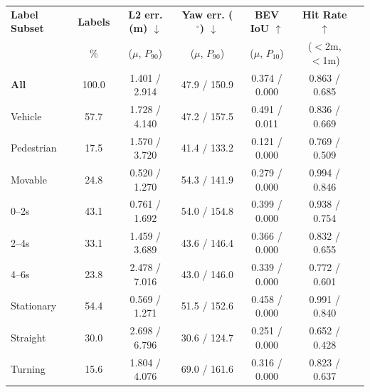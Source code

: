 \begin{tabular}{lcccccc}
\toprule
\textbf{Label Subset} & \textbf{Labels} & \textbf{L2 err. (m) $\downarrow$} & \textbf{Yaw err. ($^\circ$) $\downarrow$} & \textbf{BEV IoU $\uparrow$} & \textbf{Hit Rate $\uparrow$} \\
 & \% & ($\mu$, $P_{90}$) & ($\mu$, $P_{90}$) & ($\mu$, $P_{10}$) & ($<$2m, $<$1m) \\
\midrule \midrule
\textbf{All} & 100.0 & 1.401 / 2.914 & 47.9 / 150.9 & 0.374 / 0.000 & 0.863 / 0.685 \\
\midrule
Vehicle & 57.7 & 1.728 / 4.140 & 47.2 / 157.5 & 0.491 / 0.011 & 0.836 / 0.669 \\
Pedestrian & 17.5 & 1.570 / 3.720 & 41.4 / 133.2 & 0.121 / 0.000 & 0.769 / 0.509 \\
Movable & 24.8 & 0.520 / 1.270 & 54.3 / 141.9 & 0.279 / 0.000 & 0.994 / 0.846 \\
\midrule
0--2s & 43.1 & 0.761 / 1.692 & 54.0 / 154.8 & 0.399 / 0.000 & 0.938 / 0.754 \\
2--4s & 33.1 & 1.459 / 3.689 & 43.6 / 146.4 & 0.366 / 0.000 & 0.832 / 0.655 \\
4--6s & 23.8 & 2.478 / 7.016 & 43.0 / 146.0 & 0.339 / 0.000 & 0.772 / 0.601 \\
\midrule
Stationary & 54.4 & 0.569 / 1.271 & 51.5 / 152.6 & 0.458 / 0.000 & 0.991 / 0.840 \\
Straight & 30.0 & 2.698 / 6.796 & 30.6 / 124.7 & 0.251 / 0.000 & 0.652 / 0.428 \\
Turning & 15.6 & 1.804 / 4.076 & 69.0 / 161.6 & 0.316 / 0.000 & 0.823 / 0.637 \\
\bottomrule
\end{tabular}
